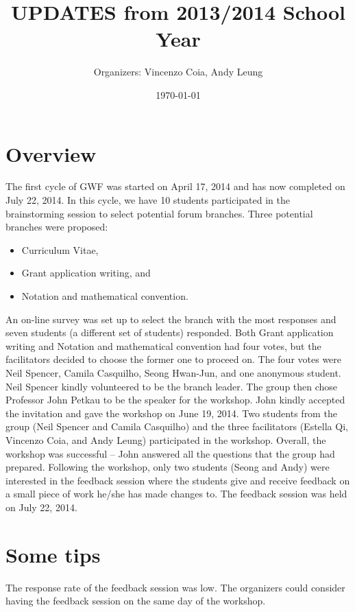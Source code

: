 \documentclass[11pt,a4paper]{article}
\title{UPDATES from 2013/2014 School Year}
\author{Organizers: Vincenzo Coia, Andy Leung}
\date{\today}
\begin{document}
\maketitle

\section{Overview}

The first cycle of GWF was started on April 17, 2014 and has now completed on July 22, 2014. In this cycle, we have 10 students participated in the brainstorming session to select potential forum branches. Three potential branches were proposed:
\begin{itemize}
\item Curriculum Vitae,
\item Grant application writing, and
\item Notation and mathematical convention. 
\end{itemize}
An on-line survey was set up to select the branch with the most responses and seven students (a different set of students) responded. Both Grant application writing and Notation and mathematical convention had four votes, but the facilitators decided to choose the former one to proceed on. The four votes were Neil Spencer, Camila Casquilho, Seong Hwan-Jun, and one anonymous student. Neil Spencer kindly volunteered to be the branch leader. The group then chose Professor John Petkau to be the speaker for the workshop. John kindly accepted the invitation and gave the workshop on June 19, 2014. Two students from the group (Neil Spencer and Camila Casquilho) and the three facilitators (Estella Qi, Vincenzo Coia, and Andy Leung) participated in the workshop. Overall, the workshop was successful -- John answered all the questions that the group had prepared. Following the workshop, only two students (Seong and Andy) were interested in the feedback session where the students give and receive feedback on a small piece of work he/she has made changes to. The feedback session was held on July 22, 2014. 

\section{Some tips}

The response rate of the feedback session was low. The organizers could consider having the feedback session on the same day of the workshop. 
\end{document}
